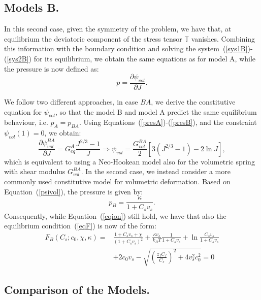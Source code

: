 \subsection{Models B.}
In this second case, given the symmetry of the problem, we have that, at equilibrium the deviatoric component of the stress tensor $\mathbb{T}$ vanishes. Combining this information with the boundary condition and solving the system~(\ref{sys1B})-(\ref{sys2B}) for its equilibrium, we obtain the same equations as for model A, while the pressure is now defined as:
\begin{equation}
p = \frac{\partial \psi_{vol}}{\partial J} .\label{presB}%
\end{equation}

We follow two different approaches, in case $BA$, we derive the constitutive equation for $\psi_{vol}$, so that the model B and model A predict the same equilibrium behaviour, i.e. $p_A=p_{BA}$. Using Equations~(\ref{presA})-(\ref{presB}), and the constraint $\psi_{vol}(1)=0$, we obtain:
\begin{equation}
\frac{\partial \psi^{BA}_{vol}}{\partial J}= G^A_{eq} \frac{J^{2/3}-1}{J} \Longrightarrow \psi_{vol} = \frac{G^{BA}_{vol}}{2}\left[3(J^{2/3} -1) - 2\ln J\right],
\end{equation}
which is equivalent to using a Neo-Hookean model also for the volumetric spring with shear modulus $G^{BA}_{vol}$. In the second case, we instead consider a more commonly used constitutive model for volumetric deformation. Based on Equation~(\ref{psivol}), the pressure is given by:
\begin{equation}
p_{B} = \frac{\kappa}{1+C_s v_s}.
\end{equation}
Consequently, while Equation~(\ref{eqion}) still hold, we have that also the equilibrium condition~(\ref{eqF}) is now of the form:
\begin{equation}
\begin{aligned}
F_{B}(C_s; c_0,\chi,\kappa)=&\frac{1+C_sv_s+\chi}{(1+C_sv_s)^2}+\frac{\kappa v_s}{k_BT} \frac{1}{1+C_sv_s}+\ln \frac{C_sv_s}{1+C_sv_s}\\[1.5mm]
& +2c_0v_s-\sqrt{\left(\frac{z_fC_f}{C_s}\right)^2+4v_s^2c^2_0} =0 \label{eqFb}
\end{aligned}
\end{equation}
\subsection{Comparison of the Models.}

